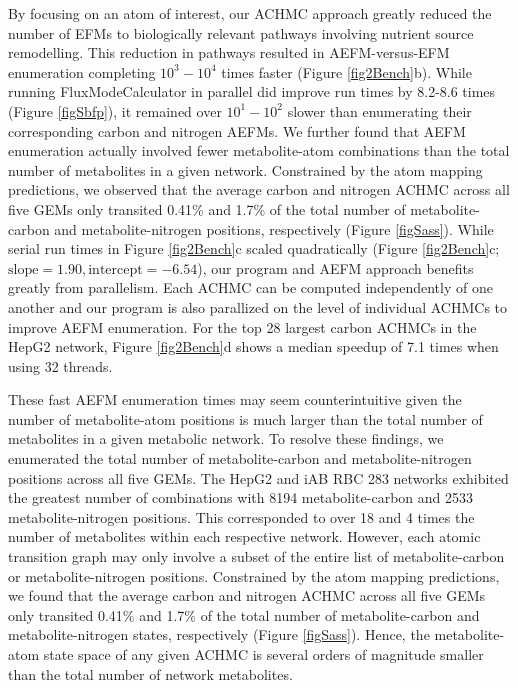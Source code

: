 \documentclass[12pt]{article}
\begin{document}
By focusing on an atom of interest, our ACHMC approach greatly reduced the
number of EFMs to biologically relevant pathways involving nutrient source
remodelling. This reduction in pathways resulted in AEFM-versus-EFM
enumeration completing $10^3-10^4$ times faster (Figure \ref{fig2Bench}b).
While running FluxModeCalculator in parallel did improve run times by
8.2-8.6 times (Figure \ref{figSbfp}), it remained over $10^1-10^2$ slower
  than enumerating their corresponding carbon and nitrogen AEFMs. We
  further found that AEFM enumeration actually involved fewer
  metabolite-atom combinations than the total number of metabolites in
  a given network. Constrained by the atom mapping predictions, we
  observed that the average carbon and nitrogen ACHMC across all five GEMs
  only transited 0.41\% and 1.7\% of the total number of metabolite-carbon
  and metabolite-nitrogen positions, respectively (Figure \ref{figSass}).
  While serial run times in Figure \ref{fig2Bench}c scaled quadratically
  (Figure \ref{fig2Bench}c; $\text{slope}=1.90, \text{intercept}=-6.54$),
  our program and AEFM approach benefits greatly from parallelism. Each
  ACHMC can be computed independently of one another and our program is
  also parallized on the level of individual ACHMCs to improve AEFM
  enumeration. For the top 28 largest carbon ACHMCs in the HepG2 network,
  Figure \ref{fig2Bench}d shows a median speedup of 7.1 times when using
  32 threads. 


\iffalse

These fast AEFM enumeration times may seem counterintuitive given the
number of metabolite-atom positions is much larger than the total number
of metabolites in a given metabolic network. To resolve these findings, we
enumerated the total number of metabolite-carbon and metabolite-nitrogen
positions across all five GEMs. The HepG2 and iAB RBC 283 networks
exhibited the greatest number of combinations with 8194 metabolite-carbon
and 2533 metabolite-nitrogen positions. This corresponded to over 18 and
4 times the number of metabolites within each respective network. However,
  each atomic transition graph may only involve a subset of the entire
  list of metabolite-carbon or metabolite-nitrogen positions. Constrained
  by the atom mapping predictions, we found that the average carbon and
  nitrogen ACHMC across all five GEMs only transited 0.41\% and
1.7\% of the total number of metabolite-carbon and metabolite-nitrogen
states, respectively (Figure \ref{figSass}). Hence, the metabolite-atom state space
of any given ACHMC is several orders of magnitude smaller than the total
number of network metabolites.
\end{document}
